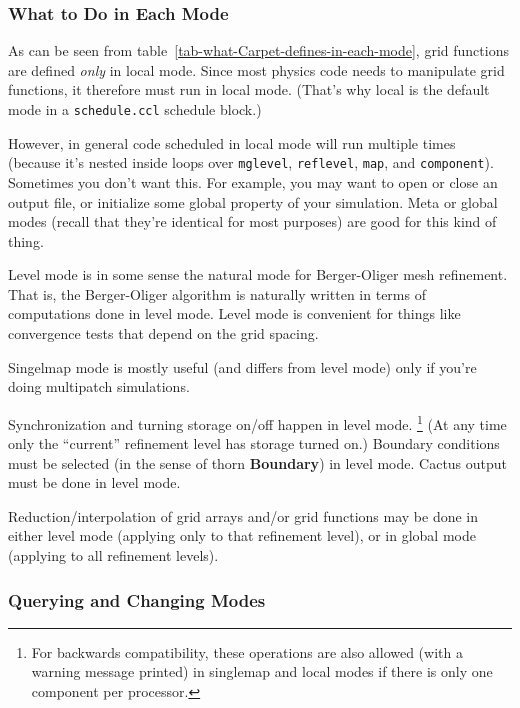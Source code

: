 \documentclass{article}
\def\thorn#1{\textbf{#1}}
\begin{document}

\subsubsection{What to Do in Each Mode}

As can be seen from table~\ref{tab-what-Carpet-defines-in-each-mode},
grid functions are defined \emph{only} in local mode.  Since most physics
code needs to manipulate grid functions, it therefore must run in local
mode.  (That's why local is the default mode in a \verb|schedule.ccl|
schedule block.)

However, in general code scheduled in local mode will run multiple times
(because it's nested inside loops over \texttt{mglevel}, \texttt{reflevel},
\texttt{map}, and \texttt{component}).  Sometimes you don't want this.
For example, you may want to open or close an output file, or initialize
some global property of your simulation.  Meta or global modes (recall
that they're identical for most purposes) are good for this kind of thing.

Level mode is in some sense the natural mode for Berger-Oliger mesh
refinement.  That is, the Berger-Oliger algorithm is naturally written
in terms of computations done in level mode.  Level mode is convenient
for things like convergence tests that depend on the grid spacing.

Singelmap mode is mostly useful (and differs from level mode) only if
you're doing multipatch simulations.

Synchronization and turning storage on/off happen in level mode.%
\footnote{%
	 For backwards compatibility, these operations are
	 also allowed (with a warning message printed) in
	 singlemap and local modes if there is only one
	 component per processor.
	 }%
{}  (At any time only the ``current'' refinement level has storage
turned on.)  Boundary conditions must be selected (in the sense of
thorn \thorn{Boundary}) in level mode.  Cactus output must be done
in level mode.

Reduction/interpolation of grid arrays and/or grid functions may be
done in either level mode (applying only to that refinement level),
or in global mode (applying to all refinement levels).  


\subsubsection{Querying and Changing Modes}
\end{document}
